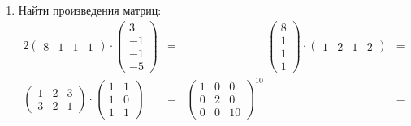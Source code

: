 \begin{enumerate}
\item Найти произведения матриц:
\begin{alignat*}{2}
    \begin{pmatrix}
        8 & 1 & 1 & 1
    \end{pmatrix}
    \cdot
    \begin{pmatrix}
        3 \\
        -1 \\
        -1 \\
        -5
    \end{pmatrix}
    &=
    & \hspace{3cm}
    \begin{pmatrix}
        8 \\
        1 \\
        1 \\
        1
    \end{pmatrix}
    \cdot
    \begin{pmatrix}
        1 & 2 & 1 & 2
    \end{pmatrix}
    &= \\[1em]
    \begin{pmatrix}
        1 & 2 & 3\\
        3 & 2 & 1
    \end{pmatrix}
    \cdot
    \begin{pmatrix}
        1 & 1 \\
        1 & 0 \\
        1 & 1
    \end{pmatrix}
    &=
    &
    \begin{pmatrix}
        1 & 0 & 0\\
        0 & 2 & 0\\
        0 & 0 & 10
    \end{pmatrix}
    ^{10}
    &=
\end{alignat*}



\end{enumerate}

